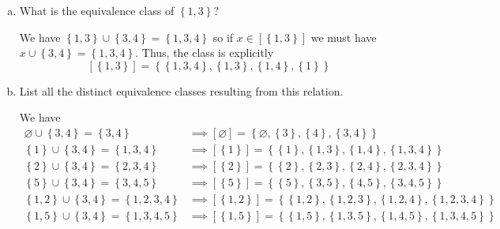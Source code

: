 \documentclass{article}
\begin{document}
\begin{itemize}
\begin{enumerate}[(a)]
\begin{proof}
					Thus, $R$ is indeed an equivalence relation.
				\end{proof}

			\item What is the equivalence class of $\left\{ 1, 3 \right\}?$
				\begin{soln}
					We have $\left\{ 1, 3 \right\}\cup \left\{ 3, 4 \right\}=\left\{ 1, 3, 4 \right\}$ so if $x\in\left[ \left\{ 1, 3 \right\} \right]$ we must have $x\cup \left\{ 3, 4 \right\} = \left\{ 1, 3, 4 \right\}.$ Thus, the class is explicitly
					\[ \left[ \left\{ 1, 3 \right\} \right]=\left\{ \left\{ 1, 3, 4 \right\}, \left\{ 1, 3 \right\}, \left\{ 1, 4 \right\}, \left\{ 1 \right\} \right\}\]
				\end{soln}

				\newpage
			\item List all the distinct equivalence classes resulting from this relation.
				\begin{soln}
					We have
					\begin{align*}
						\varnothing\cup \left\{ 3, 4 \right\} = \left\{ 3, 4 \right\} &\implies \left[ \varnothing \right] = \left\{ \varnothing, \left\{ 3 \right\}, \left\{ 4 \right\}, \left\{ 3, 4 \right\} \right\} \\
						\left\{ 1 \right\}\cup \left\{ 3, 4 \right\} = \left\{ 1, 3, 4 \right\} &\implies \left[ \left\{ 1 \right\} \right] = \left\{ \left\{ 1 \right\}, \left\{ 1, 3 \right\}, \left\{ 1, 4 \right\}, \left\{ 1, 3, 4 \right\} \right\} \\
						\left\{ 2 \right\}\cup \left\{ 3, 4 \right\} = \left\{ 2, 3, 4 \right\} &\implies \left[ \left\{ 2 \right\} \right] = \left\{ \left\{ 2 \right\}, \left\{ 2, 3 \right\}, \left\{ 2, 4 \right\}, \left\{ 2, 3, 4 \right\} \right\} \\
						\left\{ 5 \right\}\cup \left\{ 3, 4 \right\} = \left\{ 3, 4, 5 \right\} &\implies \left[ \left\{ 5 \right\} \right] = \left\{ \left\{ 5 \right\}, \left\{ 3, 5 \right\}, \left\{ 4, 5 \right\}, \left\{ 3, 4, 5 \right\} \right\} \\
						\left\{ 1, 2 \right\}\cup \left\{ 3, 4 \right\} = \left\{ 1, 2, 3, 4 \right\} &\implies \left[ \left\{ 1, 2 \right\} \right] = \left\{ \left\{ 1, 2 \right\}, \left\{ 1, 2, 3 \right\}, \left\{ 1, 2, 4 \right\}, \left\{ 1, 2, 3, 4 \right\} \right\} \\
						\left\{ 1, 5 \right\}\cup\left\{ 3, 4 \right\} = \left\{ 1, 3, 4, 5 \right\} &\implies \left[ \left\{ 1, 5 \right\} \right] = \left\{ \left\{ 1, 5 \right\}, \left\{ 1, 3, 5 \right\}, \left\{ 1, 4, 5 \right\}, \left\{ 1, 3, 4, 5 \right\} \right\} \\

\end{align*}
\end{soln}
\end{enumerate}
\end{itemize}
\end{document}
